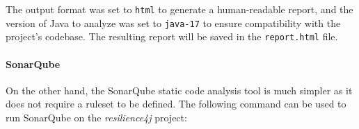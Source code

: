The output format was set to \texttt{html} to generate a human-readable report, and the version of Java to analyze was set to \texttt{java-17} to ensure compatibility with the project's codebase. The resulting report will be saved in the \texttt{report.html} file.

\paragraph{SonarQube}

On the other hand, the SonarQube static code analysis tool is much simpler as it does not require a ruleset to be defined. The following command can be used to run SonarQube on the \textit{resilience4j} project:





